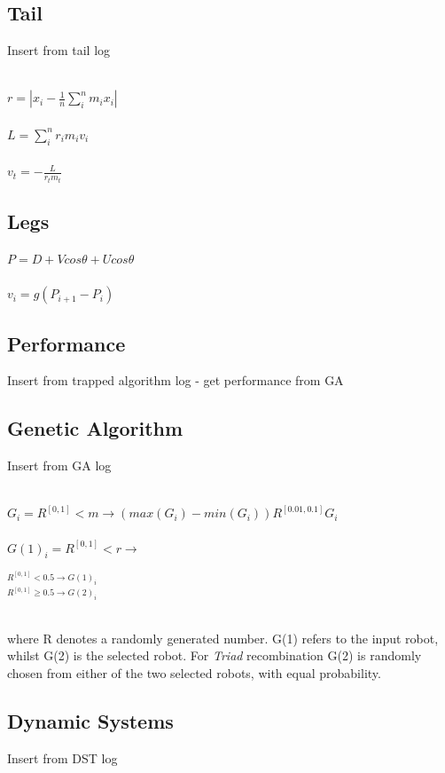 \documentclass{article}
\begin{document}
\subsection{Tail}
Insert from tail log\\
\begin{Large}\\
$r = |x_{i} - \frac{1}{n}\sum_{i}^{n}m_{i}x_{i}|$\\\\
$L = \sum^{n}_{i} r_{i}m_{i}v_{i}$\\\\
$v_{t} = - \frac{L}{r_{t}m_{t}}$
\end{Large}

\subsection{Legs}
\begin{Large}
$P = D + Vcos\theta + Ucos\theta$\\\\
$v_{i} = g(P_{i + 1} - P_{i})$
\end{Large}
\subsection{Performance}
Insert from trapped algorithm log - get performance from GA
\subsection{Genetic Algorithm}
Insert from GA log\\
\begin{Large}\\
$G_{i} = R^{[0, 1]} < m \longrightarrow 
(max(G_{i}) - min(G_{i})) R^{[0.01, 0.1]}  G_{i}$\\\\
$G(1)_{i} = R^{[0, 1]} < r \longrightarrow$ 
\begin{LARGE}
$^{R^{[0, 1]} < 0.5\longrightarrow G(1)_{i}} 
_{R^{[0, 1]} \geq 0.5 \longrightarrow G(2)_{i}}$\\\\
\end{LARGE}

\end{Large}
where R denotes a randomly generated number. G(1) refers to the input robot, whilst G(2) is the selected robot. For \textit{Triad} recombination G(2) is randomly chosen from either of the two selected robots, with equal probability.
\subsection{Dynamic Systems}
Insert from DST log
\end{document}
